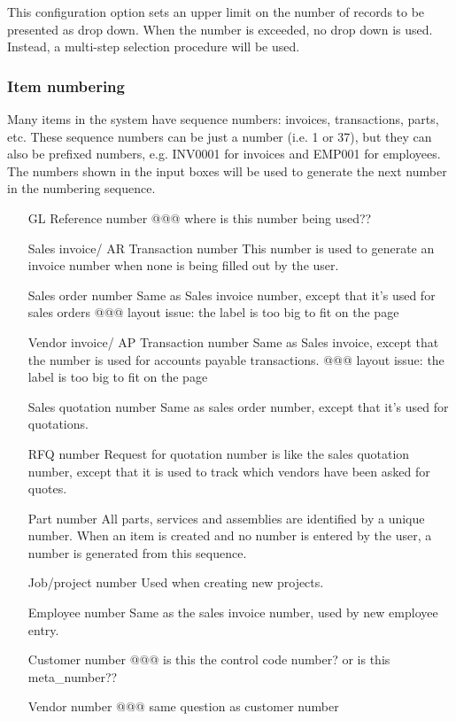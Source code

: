 \documentclass[10pt,A4]{book}
\begin{document}
This configuration option sets an upper limit on the number of records to be
presented as drop down.  When the number is exceeded, no drop down is used.  Instead,
a multi-step selection procedure will be used.

\subsubsection{Item numbering}

Many items in the system have sequence numbers: invoices, transactions, parts, etc. These sequence numbers can be just a number (i.e. 1 or 37),
but they can also be prefixed numbers, e.g. INV0001 for invoices and EMP001 for employees.
The numbers shown in the input boxes will be used to generate the next number in the
numbering sequence.
\begin{itemize}
\item [GL Reference number] @@@ where is this number being used??
\item [Sales invoice/ AR Transaction number] This number is used to generate an invoice
number when none is being filled out by the user.
\item [Sales order number] Same as Sales invoice number, except that it's used for sales orders @@@ layout issue: the label is too big to fit on the page
\item [Vendor invoice/ AP Transaction number] Same as Sales invoice, except that the number
is used for accounts payable transactions. @@@ layout issue: the label is too big to fit on the page
\item [Sales quotation number] Same as sales order number, except that it's used for quotations.
\item [RFQ number] Request for quotation number is like the sales quotation number, except
that it is used to track which vendors have been asked for quotes.
\item [Part number] All parts, services and assemblies are identified by a unique number.
When an item is created and no number is entered by the user, a number is generated
from this sequence.
\item [Job/project number] Used when creating new projects.
\item [Employee number] Same as the sales invoice number, used by new employee entry.
\item [Customer number] @@@ is this the control code number? or is this meta\_number??
\item [Vendor number] @@@ same question as customer number
\end{itemize}
\end{document}
